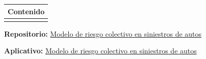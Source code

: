 \documentclass{article}
\theoremstyle{definition}
\theoremstyle{remark}
\newenvironment{cuadrocontenido}{
  \begin{center}
  \begin{tabular}{|p{0.97\textwidth}|}
    \hline
    \multicolumn{1}{|c|}{
        \rule{0pt}{2.5ex}
        \textbf{\large Contenido}
        \rule{0pt}{2.5ex}
    } \\
    \hline
    \begin{minipage}{0.96\textwidth}
        \centering
        \vspace{0.5em}
}{%
        \vspace{0.5em}
    \end{minipage} \\
    \hline
  \end{tabular}
  \end{center}
}
\begin{document}
\thispagestyle{firstpage}
\vspace*{9\baselineskip}

\renewcommand{\contentsname}{}
\begin{cuadrocontenido}
  \tableofcontents
\end{cuadrocontenido}

\textbf{Repositorio:} \href{https://github.com/RiemannIntegrable/modelo-de-riesgo-colectivo-en-siniestros-de-autos}{Modelo de riesgo colectivo en siniestros de autos}

\textbf{Aplicativo:} \href{a}{Modelo de riesgo colectivo en siniestros de autos}
\end{document}
